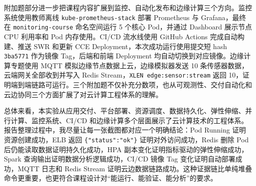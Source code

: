 \documentclass[bwprint]{report}
\begin{document}
附加题部分进一步把课程内容扩展到监控、自动化发布和边缘计算三个方向。监控系统使用教师离线 \texttt{kube-prometheus-stack} 部署 Prometheus 与 Grafana，最终在 \texttt{monitoring-course} 命名空间运行 5 个核心 Pod，并通过 Dashboard 展示节点 CPU 利用率和 Pod 内存使用。CI/CD 流水线使用 GitHub Actions 完成自动构建、推送 SWR 和更新 CCE Deployment，本次成功运行使用提交短 hash \texttt{3ba5771} 作为镜像 Tag，后端和前端 Deployment 均自动切换到对应镜像。边缘计算专题使用 MQTT 模拟边缘节点数据上云，边缘模拟器发送 10 条传感器数据，云端网关全部收到并写入 Redis Stream，\texttt{XLEN edge:sensor:stream} 返回 10，证明端到端链路可运行。三个附加题不仅补充分数项，也从可观测性、交付自动化和云边协同三个方面扩展了对云计算工程体系的理解。

总体来看，本实验从应用交付、平台部署、资源调度、数据持久化、弹性伸缩、并行计算、监控系统、CI/CD 和边缘计算多个层面展示了云计算技术的工程体系。报告整理过程中，我尽量让每一张截图都对应一个明确结论：Pod Running 证明资源创建成功，ELB 返回 \texttt{\{"status":"ok"\}} 证明对外访问成功，Redis 删除 Pod 后仍能读取数据证明持久化成功，HPA 副本变化证明指标驱动的弹性伸缩成功，Spark 查询输出证明数据分析逻辑成功，CI/CD 镜像 Tag 变化证明自动部署成功，MQTT 日志和 Redis Stream 证明云边数据链路成功。这种证据链比单纯堆叠命令更重要，也更符合课程设计对“能运行、能验证、能分析”的要求。

\nocite{*}


\end{document}
